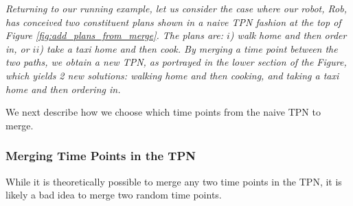 

\begin{tcolorbox}[colback=red!5!white,colframe=red!75!black]
  \textit{Returning to our running example, let us consider the case where our robot, Rob, has conceived two constituent plans
   shown in a \textit{naive} TPN fashion at the top of Figure \ref{fig:add_plans_from_merge}.
   The plans are: $i$) walk home and then order in, or $ii$) take a taxi home and then cook.
   By merging a time point between the two paths, we obtain a new TPN, as portrayed in the lower section of the Figure, which yields 2 
   new solutions: walking home and then cooking, and taking a taxi home and then ordering in.
  }
\end{tcolorbox}


We next describe how we choose which time points from the naive TPN to merge.


\subsubsection{Merging Time Points in the TPN} 
While it is theoretically possible to merge any two time points in the TPN, it is likely a bad idea to merge two random time points. 

